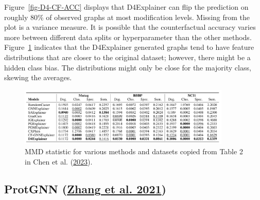 \documentclass[
  11pt,
  letterpaper,
]{article}
\begin{document}
Figure~\ref{fig-D4-CF-ACC} displays that D4Explainer can flip the
prediction on roughly 80\% of observed graphs at most modification
levels. Missing from the plot is a variance measure. It is possible that
the counterfactual accuracy varies more between different data splits or
hyperparameter than the other methods. Figure~\ref{fig-D4-MMD} indicates
that the D4Explainer generated graphs tend to have feature distributions
that are closer to the original dataset; however, there might be a
hidden class bias. The distributions might only be close for the
majority class, skewing the averages.

\begin{figure}

{\centering \includegraphics[width=0.9\textwidth,height=\textheight]{figures/D4-MMD-Table.png}

}

\caption{\label{fig-D4-MMD}MMD statistic for various methods and
datasets copied from Table 2 in Chen et al.
(\protect\hyperlink{ref-Chen_Wu_Gupta_Ying_2023}{2023}).}

\end{figure}

\hypertarget{protgnn-zhang_liu_wang_lu_lee_2021}{%
\subsection{\texorpdfstring{ProtGNN
(\protect\hyperlink{ref-Zhang_Liu_Wang_Lu_Lee_2021}{Zhang et al.
2021})}{ProtGNN (Zhang et al. 2021)}}\label{protgnn-zhang_liu_wang_lu_lee_2021}}
\end{document}
